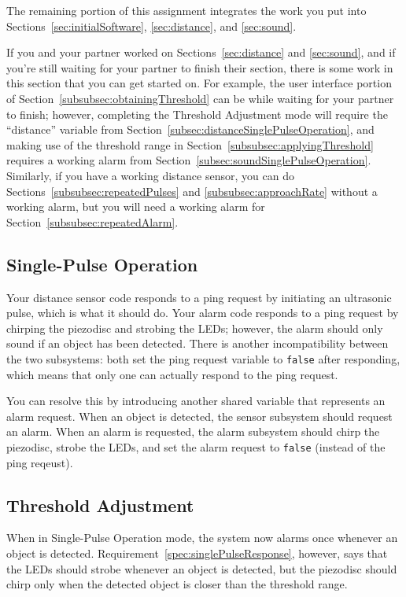 The remaining portion of this assignment integrates the work you put into Sections~\ref{sec:initialSoftware}, \ref{sec:distance}, and \ref{sec:sound}.

If you and your partner worked on Sections~\ref{sec:distance} and \ref{sec:sound}, and if you're still waiting for your partner to finish their section, there is some work in this section that you can get started on.
For example, the user interface portion of Section~\ref{subsubsec:obtainingThreshold} can be while waiting for your partner to finish; however, completing the Threshold Adjustment mode will require the ``distance'' variable from Section~\ref{subsec:distanceSinglePulseOperation}, and making use of the threshold range in Section~\ref{subsubsec:applyingThreshold} requires a working alarm from Section~\ref{subsec:soundSinglePulseOperation}.
Similarly, if you have a working distance sensor, you can do Sections~\ref{subsubsec:repeatedPulses} and \ref{subsubsec:approachRate} without a working alarm, but you will need a working alarm for Section~\ref{subsubsec:repeatedAlarm}.

\subsection{Single-Pulse Operation} \label{subsec:integrationSpeedSinglePulseOperation}

Your distance sensor code responds to a ping request by initiating an ultrasonic pulse, which is what it should do.
Your alarm code responds to a ping request by chirping the piezodisc and strobing the LEDs;
however, the alarm should only sound if an object has been detected.
There is another incompatibility between the two subsystems:
both set the ping request variable to \lstinline{false} after responding, which means that only one can actually respond to the ping request.

You can resolve this by introducing another shared variable that represents an alarm request.
When an object is detected, the sensor subsystem should request an alarm.
When an alarm is requested, the alarm subsystem should chirp the piezodisc, strobe the LEDs, and set the alarm request to \lstinline{false} (instead of the ping reqeust).

\subsection{Threshold Adjustment}

When in Single-Pulse Operation mode, the system now alarms once whenever an object is detected.
Requirement~\ref{spec:singlePulseResponse}, however, says that the LEDs should strobe whenever an object is detected,
but the piezodisc should chirp only when the detected object is closer than the threshold range.

